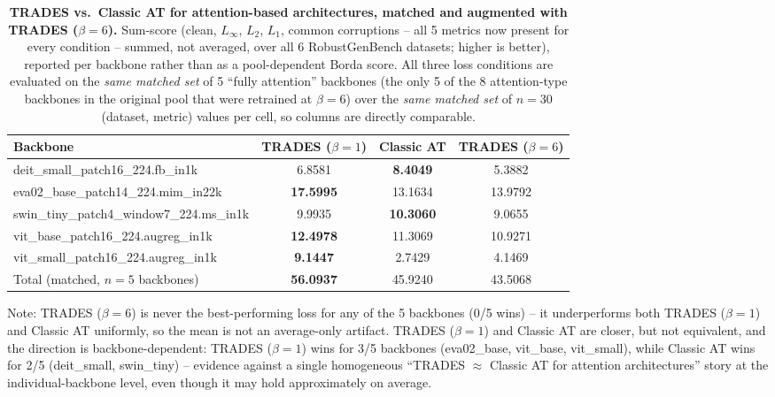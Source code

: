 \begin{table}[t]
\centering
\caption{\textbf{TRADES vs.\ Classic AT for attention-based architectures, matched
and augmented with TRADES ($\beta=6$).} Sum-score (clean, $L_\infty$, $L_2$,
$L_1$, common corruptions -- all 5 metrics now present for every condition --
summed, not averaged, over all 6 RobustGenBench datasets; higher is better),
reported per backbone rather than as a pool-dependent Borda score. All three
loss conditions are evaluated on the \emph{same matched set} of 5 ``fully
attention'' backbones (the only 5 of the 8 attention-type backbones in the
original pool that were retrained at $\beta=6$) over the \emph{same matched
set} of $n{=}30$ (dataset, metric) values per cell, so columns are directly
comparable.}
\label{tab:attention-beta6}
\begin{tabular}{lccc}
\toprule
Backbone & TRADES ($\beta=1$) & Classic AT & TRADES ($\beta=6$) \\
\midrule
deit\_small\_patch16\_224.fb\_in1k        &  6.8581 & \textbf{8.4049} &  5.3882 \\
eva02\_base\_patch14\_224.mim\_in22k      & \textbf{17.5995} & 13.1634 & 13.9792 \\
swin\_tiny\_patch4\_window7\_224.ms\_in1k &  9.9935 & \textbf{10.3060} &  9.0655 \\
vit\_base\_patch16\_224.augreg\_in1k      & \textbf{12.4978} & 11.3069 & 10.9271 \\
vit\_small\_patch16\_224.augreg\_in1k     &  \textbf{9.1447} &  2.7429 &  4.1469 \\
\midrule
Total (matched, $n{=}5$ backbones) & \textbf{56.0937} & 45.9240 & 43.5068 \\
\bottomrule
\end{tabular}

\vspace{2pt}
\footnotesize
Note: TRADES ($\beta=6$) is never the best-performing loss for any of the 5
backbones (0/5 wins) -- it underperforms both TRADES ($\beta=1$) and Classic AT
uniformly, so the mean is not an average-only artifact. TRADES ($\beta=1$) and
Classic AT are closer, but not equivalent, and the direction is
backbone-dependent: TRADES ($\beta=1$) wins for 3/5 backbones (eva02\_base,
vit\_base, vit\_small), while Classic AT wins for 2/5 (deit\_small, swin\_tiny) --
evidence against a single homogeneous ``TRADES $\approx$ Classic AT for
attention architectures'' story at the individual-backbone level, even though
it may hold approximately on average.


\end{table}

